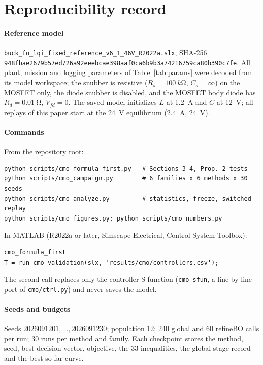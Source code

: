 \section{Reproducibility record}\label{app:repro}
\paragraph{Reference model} \texttt{buck\_fo\_lqi\_fixed\_reference\_v6\_1\_46V\_R2022a.slx},
SHA-256 \texttt{948fbae2679b57ed726a92eeebcae398aaf0ca6b9b3a74216759ca80b390c7fe}.
All plant, mission and logging parameters of Table~\ref{tab:params} were decoded
from its model workspace; the snubber is resistive ($R_s=\SI{100}{k\ohm}$,
$C_s=\infty$) on the MOSFET only, the diode snubber is disabled, and the MOSFET
body diode has $R_d=\SI{0.01}{\ohm}$, $V_{fd}=0$. The saved model initializes
$L$ at \SI{1.2}{A} and $C$ at \SI{12}{V}; all replays of this paper start at the
\SI{24}{V} equilibrium (\SI{2.4}{A}, \SI{24}{V}).

\paragraph{Commands} From the repository root:
{\footnotesize
\begin{verbatim}
python scripts/cmo_formula_first.py   # Sections 3-4, Prop. 2 tests
python scripts/cmo_campaign.py        # 6 families x 6 methods x 30 seeds
python scripts/cmo_analyze.py         # statistics, freeze, switched replay
python scripts/cmo_figures.py; python scripts/cmo_numbers.py
\end{verbatim}}
In MATLAB (R2022a or later, Simscape Electrical, Control System Toolbox):
{\footnotesize
\begin{verbatim}
cmo_formula_first
T = run_cmo_validation(slx, 'results/cmo/controllers.csv');
\end{verbatim}}
The second call replaces only the controller S-function (\texttt{cmo\_sfun},
a line-by-line port of \texttt{cmo/ctrl.py}) and never saves the model.

\paragraph{Seeds and budgets} Seeds $2026091201,\dots,2026091230$; population
12; 240 global and 60 refineBO calls per run; 30 runs per method and family.
Each checkpoint stores the method, seed, best decision vector, objective, the 33
inequalities, the global-stage record and the best-so-far curve.

